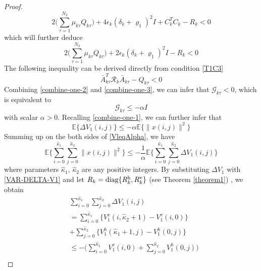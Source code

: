 \documentclass[journal,final,twocolumn]{IEEEtran}
\begin{document}
\begin{proof}
	\begin{equation}
	2\big(\sum_{\tau =1}^{N_{2}}\mu_{k\tau }Q_{k\tau }\big)+4\epsilon_{k}(\delta_{k}+\varrho_{1})^{2}I+C^{T}_{k}C_{k}-R_{k} < 0
	\end{equation}
	which will further deduce
	\begin{equation}\label{combine-one-2}
			2\big(\sum_{\tau =1}^{N_{2}}\mu_{k\tau }Q_{k\tau }\big)+2\epsilon_{k}(\delta_{k}+\varrho_{1})^{2}I-R_{k} < 0
	\end{equation}
	The following inequality can be  derived directly from condition \eqref{T1C3} 
	\begin{equation}\label{combine-one-3}
		\bar{A}^{T}_{k\tau }\mathcal{R}_{k}\bar{A}_{k\tau }-Q_{k\tau } < 0
	\end{equation}
	Combining \eqref{combine-one-2} and \eqref{combine-one-3}, we can infer that $\mathcal{G}_{k\tau }<0$, which is equivalent to 
	\begin{equation}
		\mathcal{G}_{k\tau } \leq -\alpha I
	\end{equation}
	with scalar $\alpha>0$.
	Recalling \eqref{combine-one-1}, we can further infer that
	\begin{equation}\label{VleqAlpha}
		\mathbb{E}\{\varDelta V_{1}(i,j) \} \leq-\alpha \mathbb{E}\{\|x(i,j)\|^{2} \}
	\end{equation}
	Summing up on the both sides of \eqref{VleqAlpha}, we have
	\begin{equation} \label{levE}
		\mathbb{E}\Big\{\sum_{i=0}^{\hat{\kappa}_{1}}\sum_{j=0}^{\hat{\kappa}_{2}}  \|x(i,j)\|^{2} \Big\} \leq -\frac{1}{\alpha} \mathbb{E}\Big\{\sum_{i=0}^{\hat{\kappa}_{1}}\sum_{j=0}^{\hat{\kappa}_{2}}  \varDelta V_{1}(i,j)  \Big\}
	\end{equation}
	where parameters $\hat{\kappa}_{1}$, $\hat{\kappa}_{2}$ are any positive integers. By substituting $\varDelta V_{1}$ with \eqref{VAR-DELTA-V1} and let $R_{k}=\mathrm{diag}\{R^{\rm{h}}_{k},R^{\rm{v}}_{k}\}$ (see Theorem \ref{theorem1}) , we obtain
	\begin{equation} \label{Vhv}
		\begin{split}
			&\sum_{i=0}^{\hat{\kappa}_{1}}\sum_{j=0}^{\hat{\kappa}_{2}}  \varDelta V_{1}(i,j)\\&= \sum_{i=0}^{\hat{\kappa}_{1}}\big\{V^{v}_{1}(i,\hat{\kappa}_{2}+1) - V^{v}_{1}(i,0) \big\}\\
			&+  \sum_{j=0}^{\hat{\kappa}_{2}}\big\{V^{h}_{1}(\hat{\kappa}_{1}+1,j) - V^{h}_{1}(0,j) \big\}\\
			&\leq -\big( \sum_{i=0}^{\hat{\kappa}_{1}}V^{v}_{1}(i,0) + \sum_{j=0}^{\hat{\kappa}_{2}}V^{h}_{1}(0,j)\big) \\

\end{split}
\end{equation}
\end{proof}
\end{document}
